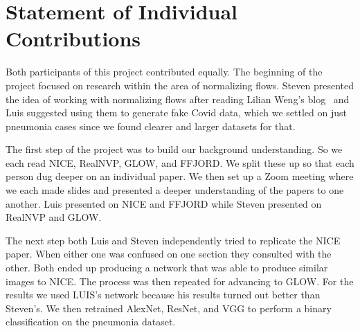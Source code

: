 \section{Statement of Individual Contributions}
Both participants of this project contributed equally. The beginning of the
project focused on research within the area of normalizing flows. Steven
presented the idea of working with normalizing flows after reading Lilian Weng's
blog~\cite{weng2018flow} and Luis suggested using them to generate fake Covid
data, which we settled on just pneumonia cases since we found clearer and larger
datasets for that. 

The first step of the project was to build our background understanding. So we
each read NICE, RealNVP, GLOW, and FFJORD. We split these up so that each person
dug deeper on an individual paper. We then set up a Zoom meeting where we each
made slides and presented a deeper understanding of the papers to one another. 
Luis presented on NICE and FFJORD while Steven presented on RealNVP and GLOW. 

The next step both Luis and Steven independently tried to replicate the NICE
paper. When either one was confused on one section they consulted with the
other. Both ended up producing a network that was able to produce similar images
to NICE. The process was then repeated for advancing to GLOW. For the results we
used LUIS's network because his results turned out better than Steven's. We then
retrained AlexNet, ResNet, and VGG to perform a binary classification on the
pneumonia dataset. 
